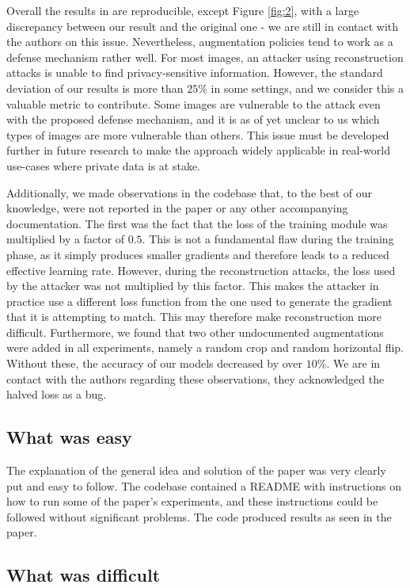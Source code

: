 Overall the results in \cite{gao2021privacy} are reproducible, except Figure \ref{fig:2}, with a large discrepancy between our result and the original one -  we are still in contact with the authors on this issue. Nevertheless, augmentation policies tend to work as a defense mechanism rather well. For most images, an attacker using reconstruction attacks is unable to find privacy-sensitive information. However, the standard deviation of our results is more than $25\%$ in some settings, and we consider this a valuable metric to contribute. Some images are vulnerable to the attack even with the proposed defense mechanism, and it is as of yet unclear to us which types of images are more vulnerable than others. This issue must be developed further in future research to make the approach widely applicable in real-world use-cases where private data is at stake.

Additionally, we made observations in the codebase that, to the best of our knowledge, were not reported in the paper or any other accompanying documentation. The first was the fact that the loss of the training module was multiplied by a factor of $0.5$. This is not a fundamental flaw during the training phase, as it simply produces smaller gradients and therefore leads to a reduced effective learning rate. However, during the reconstruction attacks, the loss used by the attacker was not multiplied by this factor. This makes the attacker in practice use a different loss function from the one used to generate the gradient that it is attempting to match. This may therefore make reconstruction more difficult. Furthermore, we found that two other undocumented augmentations were added in all experiments, namely a random crop and random horizontal flip. Without these, the accuracy of our models decreased by over $10\%$. We are in contact with the authors regarding these observations, they acknowledged the halved loss as a bug.

\subsection{What was easy}

The explanation of the general idea and solution of the paper was very clearly put and easy to follow. The codebase contained a README with instructions on how to run some of the paper's experiments, and these instructions could be followed without significant problems. The code produced results as seen in the paper.

\subsection{What was difficult}


